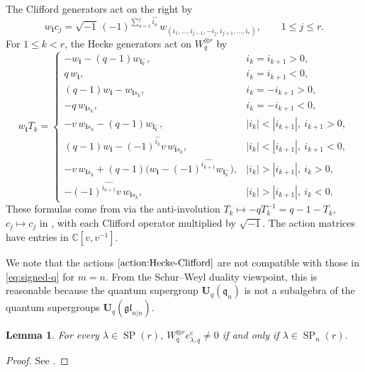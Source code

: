 \documentclass[11pt]{amsart}
\numberwithin{equation}{section}
\theoremstyle{plain}
\newtheorem{lem}[thm]{Lemma}
\theoremstyle{definition}
\theoremstyle{remark}
\begin{document}
The Clifford generators act on the right by
$$
w_{\mathbf i}c_j
=\sqrt{-1}\,(-1)^{\sum_{a=1}^{j}\widehat{i_a}}\,
w_{(i_1,\ldots,i_{j-1},-i_j,i_{j+1},\ldots,i_r)},
\qquad 1\leq j\leq r.
$$
For $1\leq k<r$, the Hecke generators act on $W_q^{\otimes r}$ by
\begin{equation}\label{action:Hecke-Clifford}
w_{\mathbf i}T_k=
\begin{cases}
-w_{\mathbf i}-(q-1)w_{\mathbf i_k^-},
& i_k=i_{k+1}>0,\\[2pt]
q\,w_{\mathbf i},
& i_k=i_{k+1}<0,\\[2pt]
(q-1)w_{\mathbf i}-w_{\mathbf i s_k},
& i_k=-i_{k+1}>0,\\[2pt]
-q\,w_{\mathbf i s_k},
& i_k=-i_{k+1}<0,\\[2pt]
-v\,w_{\mathbf i s_k}-(q-1)w_{\mathbf i_k^-},
& |i_k|<|i_{k+1}|,\ i_{k+1}>0,\\[2pt]
(q-1)w_{\mathbf i}-(-1)^{\widehat{i_k}}v\,w_{\mathbf i s_k},
& |i_k|<|i_{k+1}|,\ i_{k+1}<0,\\[2pt]
-v\,w_{\mathbf i s_k}
+(q-1)\bigl(w_{\mathbf i}-(-1)^{\widehat{i_{k+1}}}w_{\mathbf i_k^-}\bigr),
& |i_k|>|i_{k+1}|,\ i_k>0,\\[2pt]
-(-1)^{\widehat{i_{k+1}}}v\,w_{\mathbf i s_k},
& |i_k|>|i_{k+1}|,\ i_k<0.
\end{cases}
\end{equation}
These formulas come from \cite[(6.1)--(6.2)]{DW18} via the
anti-involution $T_k\mapsto -qT_k^{-1}=q-1-T_k$, $c_j\mapsto c_j$ in
\cite[Lemma~2.1(3)]{DW18}, with each Clifford operator multiplied
by $\sqrt{-1}$. The action matrices have entries in
$\mathbb C[v,v^{-1}]$. %

We note that the actions $\eqref{action:Hecke-Clifford}$ are not compatible with those in \eqref{eq:signed-q} for $m=n$. From the Schur–Weyl duality viewpoint, this is reasonable because the quantum supergroup $\mathbf{U}_q(\mathfrak{q}_n)$ is not a subalgebra of the quantum supergroups $\mathbf{U}_q(\mathfrak{gl}_{n|n})$.

\begin{lem}\label{cor:q-strict-support}
For every $\lambda\in\operatorname{SP}(r)$, 
$W_q^{\otimes r}e_{\lambda,q}^c\neq0$ if and only if $\lambda\in\operatorname{SP}_n(r)$.
\end{lem}
\begin{proof}
See \cite[Corollary~6.3, Lemma~7.5 and Theorem~7.6]{DW18}.
\end{proof}
\end{document}
